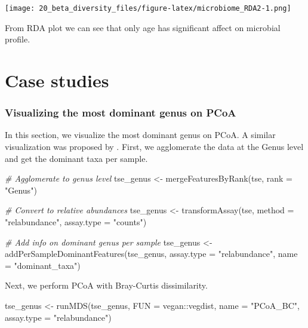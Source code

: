 \documentclass[
]{book}
\newenvironment{Shaded}{\begin{snugshade}}{\end{snugshade}}
\newcommand{\AttributeTok}[1]{\textcolor[rgb]{0.77,0.63,0.00}{#1}}
\newcommand{\CommentTok}[1]{\textcolor[rgb]{0.56,0.35,0.01}{\textit{#1}}}
\newcommand{\FunctionTok}[1]{\textcolor[rgb]{0.00,0.00,0.00}{#1}}
\newcommand{\NormalTok}[1]{#1}
\newcommand{\OtherTok}[1]{\textcolor[rgb]{0.56,0.35,0.01}{#1}}
\newcommand{\SpecialCharTok}[1]{\textcolor[rgb]{0.00,0.00,0.00}{#1}}
\newcommand{\StringTok}[1]{\textcolor[rgb]{0.31,0.60,0.02}{#1}}
\begin{document}
\texttt{[image: 20\_beta\_diversity\_files/figure-latex/microbiome\_RDA2-1.png]}

From RDA plot we can see that only age has significant affect on microbial profile.

\hypertarget{case-studies}{%
\section{Case studies}\label{case-studies}}

\hypertarget{pcoa-genus}{%
\subsubsection{Visualizing the most dominant genus on PCoA}\label{pcoa-genus}}

In this section, we visualize the most dominant genus on PCoA. A similar
visualization was proposed by \citeyearpar{Salosensaari2021}. First, we agglomerate the
data at the Genus level and get the dominant taxa per sample.

\begin{Shaded}
\begin{Highlighting}[]
\CommentTok{\# Agglomerate to genus level}
\NormalTok{tse\_genus }\OtherTok{\textless{}{-}} \FunctionTok{mergeFeaturesByRank}\NormalTok{(tse,}
                               \AttributeTok{rank =} \StringTok{"Genus"}\NormalTok{)}

\CommentTok{\# Convert to relative abundances}
\NormalTok{tse\_genus }\OtherTok{\textless{}{-}} \FunctionTok{transformAssay}\NormalTok{(tse,}
                             \AttributeTok{method =} \StringTok{"relabundance"}\NormalTok{,}
                             \AttributeTok{assay.type =} \StringTok{"counts"}\NormalTok{)}

\CommentTok{\# Add info on dominant genus per sample}
\NormalTok{tse\_genus }\OtherTok{\textless{}{-}} \FunctionTok{addPerSampleDominantFeatures}\NormalTok{(tse\_genus,}
                                      \AttributeTok{assay.type =} \StringTok{"relabundance"}\NormalTok{,}
                                      \AttributeTok{name =} \StringTok{"dominant\_taxa"}\NormalTok{)}
\end{Highlighting}
\end{Shaded}

Next, we perform PCoA with Bray-Curtis dissimilarity.

\begin{Shaded}
\begin{Highlighting}[]
\NormalTok{tse\_genus }\OtherTok{\textless{}{-}} \FunctionTok{runMDS}\NormalTok{(tse\_genus,}
                    \AttributeTok{FUN =}\NormalTok{ vegan}\SpecialCharTok{::}\NormalTok{vegdist,}
                    \AttributeTok{name =} \StringTok{"PCoA\_BC"}\NormalTok{,}
                    \AttributeTok{assay.type =} \StringTok{"relabundance"}\NormalTok{)}
\end{Highlighting}
\end{Shaded}
\end{document}
